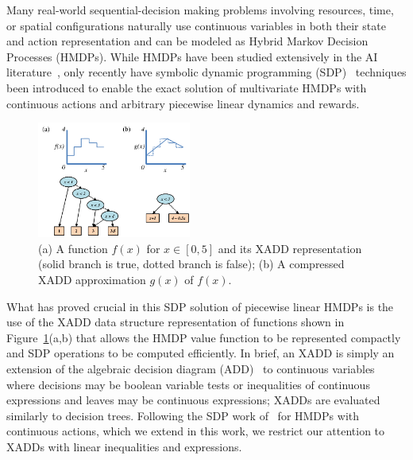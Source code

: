 Many real-world sequential-decision making problems involving
resources, time, or spatial configurations naturally use continuous
variables in both their state and action representation and can be
modeled as Hybrid Markov Decision Processes (HMDPs).  While HMDPs have
been studied extensively in the AI
literature~\cite{boyan01,feng04,li05,kveton06,phase07,hao09}, only
recently have symbolic dynamic programming
(SDP)~\cite{sanner_uai11,zamani12} techniques been introduced to
enable the exact solution of multivariate HMDPs with continuous
actions and arbitrary piecewise linear dynamics and rewards.



\begin{figure}[!ht]
\vspace{-2mm}
\centering
\hspace{-3mm}\includegraphics[width=0.45\textwidth]{Figures/xadds/intro_diagram.pdf}
\caption{\footnotesize
(a) A function $f(x)$ for $x \in [0,5]$ and its XADD representation
(solid branch is true, dotted branch is false); (b) A compressed XADD 
approximation $g(x)$ of $f(x)$.}  \label{fig:stepfunfig}
\vspace{-3mm}
\end{figure}

What has proved crucial in this SDP solution of piecewise linear HMDPs
is the use of the XADD data structure representation of functions
shown in Figure~\ref{fig:stepfunfig}(a,b) that allows the HMDP value
function to be represented compactly and SDP operations to be computed
efficiently.  In brief, an XADD is simply an extension of the
algebraic decision diagram (ADD)~\cite{bahar93add} to continuous
variables where decisions may be boolean variable tests or
inequalities of continuous expressions and leaves may be continuous
expressions; XADDs are evaluated similarly to decision trees.
Following the SDP work of~\cite{zamani12} for HMDPs with continuous
actions, which we extend in this work, we restrict our attention to
XADDs with linear inequalities and expressions.

